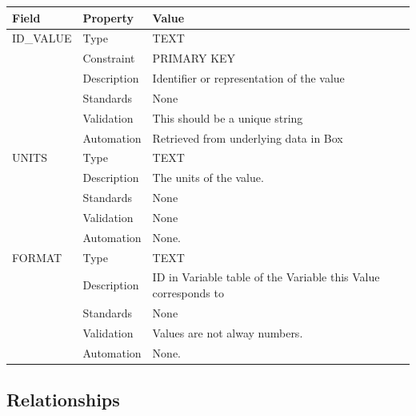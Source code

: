 \begin{longtable}[]{@{}
  >{\raggedright\arraybackslash}p{}
  >{\raggedright\arraybackslash}p{}
  >{\raggedright\arraybackslash}p{}@{}}
\toprule\noalign{}
\begin{minipage}[b]{\linewidth}\raggedright
Field
\end{minipage} & \begin{minipage}[b]{\linewidth}\raggedright
Property
\end{minipage} & \begin{minipage}[b]{\linewidth}\raggedright
Value
\end{minipage} \\
\midrule\noalign{}
\endhead
\bottomrule\noalign{}
\endlastfoot
ID\_VALUE & Type & TEXT \\
& Constraint & PRIMARY KEY \\
& Description & Identifier or representation of the value \\
& Standards & None \\
& Validation & This should be a unique string \\
& Automation & Retrieved from underlying data in Box \\
UNITS & Type & TEXT \\
& Description & The units of the value. \\
& Standards & None \\
& Validation & None \\
& Automation & None. \\
FORMAT & Type & TEXT \\
& Description & ID in Variable table of the Variable this Value
corresponds to \\
& Standards & None \\
& Validation & Values are not alway numbers. \\
& Automation & None. \\
\end{longtable}

\subsection{Relationships}\label{relationships-32}

